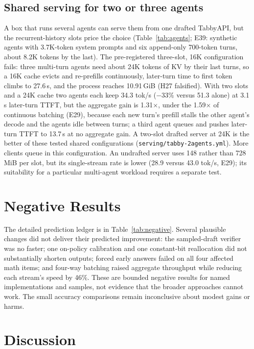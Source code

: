\documentclass[11pt]{article}
\newcommand{\q}[1]{\texttt{#1}}
\begin{document}
\subsection{Shared serving for two or three agents}
\label{sec:shared}

A box that runs several agents can serve them from one drafted TabbyAPI, but
the recurrent-history slots price the choice (Table~\ref{tab:agents}; E39:
synthetic agents with 3.7K-token system prompts and six append-only
700-token turns, about 8.2K tokens by the last). The pre-registered
three-slot, 16K configuration fails: three multi-turn agents need about 24K
tokens of KV by their last turns, so a 16K cache evicts and re-prefills
continuously, later-turn time to first token climbs to 27.6\,s, and the
process reaches 10.91\,GiB (H27 falsified). With two slots and a 24K cache
two agents each keep 34.3 tok/s ($-33\%$ versus 51.3 alone) at 3.1\,s
later-turn TTFT, but the aggregate gain is 1.31$\times$, under the
1.59$\times$ of continuous batching (E29), because each new turn's prefill
stalls the other agent's decode and the agents idle between turns; a third
agent queues and pushes later-turn TTFT to 13.7\,s at no aggregate gain. A
two-slot drafted server at 24K is the better of these tested shared
configurations (\q{serving/tabby-2agents.yml}). More clients queue in this
configuration. An undrafted server uses 148 rather than 728\,MiB per slot,
but its single-stream rate is lower (28.9 versus 43.0 tok/s, E29); its
suitability for a particular multi-agent workload requires a separate test.

\section{Negative Results}
\label{sec:negative}

The detailed prediction ledger is in Table~\ref{tab:negative}. Several
plausible changes did not deliver their predicted improvement: the
sampled-draft verifier was no faster; one on-policy calibration and one
constant-bit reallocation did not substantially shorten outputs; forced
early answers failed on all four affected math items; and four-way batching
raised aggregate throughput while reducing each stream's speed by 46\%.
These are bounded negative results for named implementations and samples,
not evidence that the broader approaches cannot work. The small accuracy
comparisons remain inconclusive about modest gains or harms.

\section{Discussion}
\label{sec:discussion}
\end{document}
